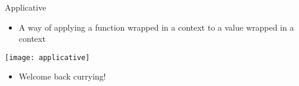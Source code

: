 \begin{frame}{Applicative}
	\begin{itemize}
		\item A way of applying a function wrapped in a context to a value wrapped in a context
	\end{itemize}
	\texttt{[image: applicative]}
	\begin{itemize}
		\item<2-> Welcome back currying!
	\end{itemize}
\end{frame}